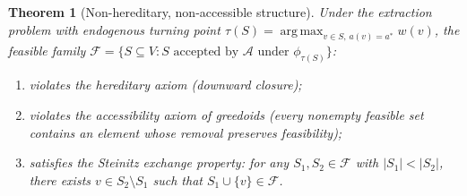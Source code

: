 \documentclass[11pt]{article}
\theoremstyle{plain}
\newtheorem{theorem}{Theorem}[section]
\theoremstyle{definition}
\theoremstyle{remark}
\DeclareMathOperator*{\argmax}{arg\,max}
\begin{document}
\begin{theorem}[Non-hereditary, non-accessible structure]
\label{thm:non-hereditary}
Under the extraction problem with endogenous turning point
$\tau(S) = \argmax_{v \in S,\, a(v)=a^*} w(v)$, the feasible family
$\mathcal{F} = \{S \subseteq V : S \text{ accepted by } \mathcal{A}
\text{ under } \phi_{\tau(S)}\}$:
\begin{enumerate}[label=(\alph*)]
  \item violates the hereditary axiom (downward closure);
  \item violates the accessibility axiom of greedoids (every nonempty
    feasible set contains an element whose removal preserves
    feasibility);
  \item satisfies the Steinitz exchange property: for any
    $S_1, S_2 \in \mathcal{F}$ with $|S_1| < |S_2|$, there exists
    $v \in S_2 \setminus S_1$ such that $S_1 \cup \{v\} \in \mathcal{F}$.
\end{enumerate}
\end{theorem}
\end{document}
